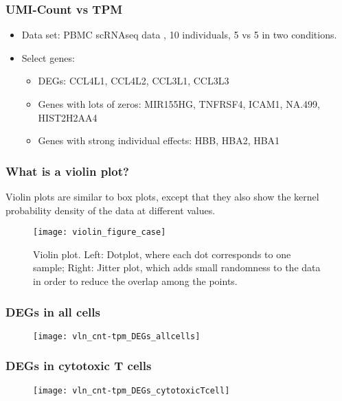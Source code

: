 
\begin{frame}
  \frametitle{UMI-Count vs TPM}
  \begin{itemize}
  \item
    Data set: PBMC scRNAseq data \cite{yuen2020high}, 10 individuals, 5 vs 5 in
    two conditions.
  \item
    Select genes:
    \begin{itemize}
    \item
      DEGs: CCL4L1, CCL4L2, CCL3L1, CCL3L3
    \item
      Genes with lots of zeros: MIR155HG, TNFRSF4, ICAM1, NA.499, HIST2H2AA4
    \item
      Genes with strong individual effects: HBB, HBA2, HBA1 
    \end{itemize}
  \end{itemize}
\end{frame}

\begin{frame}
  \frametitle{What is a violin plot?}
  Violin plots are similar to box plots, except that they also show the kernel
  probability density of the data at different values.
  \begin{figure}
    \centering
    \texttt{[image: violin\_figure\_case]}
    \caption{Violin plot. Left: Dotplot, where each dot corresponds to one
      sample; Right: Jitter plot, which adds small randomness to the data in
      order to reduce the overlap among the points.}
  \end{figure}
\end{frame}

\begin{frame}
  \frametitle{DEGs in all cells}
  \begin{figure}
    \centering
    \texttt{[image: vln\_cnt-tpm\_DEGs\_allcells]}
  \end{figure}
\end{frame}

\begin{frame}
  \frametitle{DEGs in cytotoxic T cells}
  \begin{figure}
    \centering
    \texttt{[image: vln\_cnt-tpm\_DEGs\_cytotoxicTcell]}
  \end{figure}
\end{frame}

